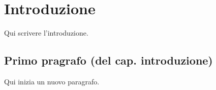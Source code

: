 %
% 



\chapter{Introduzione}
\resetPageNumbering 

Qui scrivere l'introduzione. 

\section{Primo pragrafo (del cap. introduzione)}
Qui inizia un nuovo paragrafo.\par 





